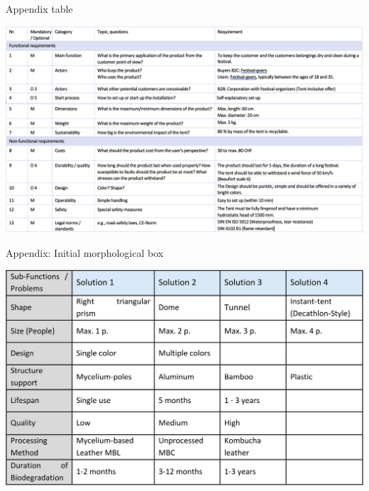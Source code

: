 \documentclass{article}
\begin{document}
\newpage
\begin{landscape}
    \thispagestyle{empty}
    \label{sec:appendix}
    \begin{table}[ht!]
        \centering
        \caption{Appendix table}
        \label{tab:appendix}
        \includegraphics[width=1.5\textwidth]{media/appendix.png}
    \end{table}
\end{landscape}

\newpage
\pagestyle{fancy}
\begin{table}[ht!]
    \centering
    \caption{Appendix: Initial morphological box}
    \label{tab:initial_morph}
    \includegraphics[width=\textwidth]{media/initial_morph.png}
\end{table}
\end{document}

